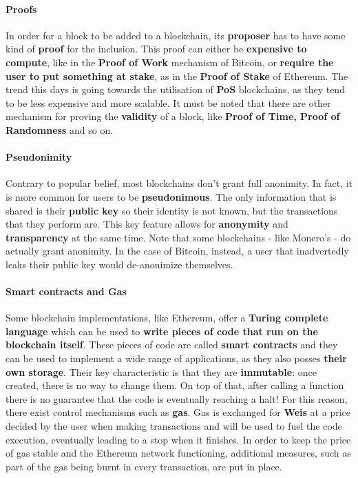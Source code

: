 \documentclass[12pt,a4paper,oneside]{article}
\theoremstyle{definition}
\begin{document}
\paragraph{Proofs} In order for a block to be added to a blockchain, its \textbf{proposer} has to have some kind of \textbf{proof} for the inclusion. This proof can either be \textbf{expensive to compute}, like in the \textbf{Proof of Work} mechanism of Bitcoin, or \textbf{require the user to put something at stake}, as in the \textbf{Proof of Stake} of Ethereum. The trend this days is going towards the utilisation of \textbf{PoS} blockchains, as they tend to be less expensive and more scalable. It must be noted that there are other mechanism for proving the \textbf{validity} of a block, like \textbf{Proof of Time, Proof of Randomness} and so on.

\paragraph{Pseudonimity} Contrary to popular belief, most blockchains don't grant full anonimity. In fact, it is more common for users to be \textbf{pseudonimous}. The only information that is shared is their \textbf{public key} so their identity is not known, but the transactions that they perform are. This key feature allows for \textbf{anonymity} and \textbf{transparency} at the same time. Note that some blockchains - like Monero's - do actually grant anonimity. In the case of Bitcoin, instead, a user that inadvertedly leaks their public key would de-anonimize themselves.

\paragraph{Smart contracts and Gas} Some blockchain implementations, like Ethereum, offer a \textbf{Turing complete language} which can be used to \textbf{write pieces of code that run on the blockchain itself}. These pieces of code are called \textbf{smart contracts} and they can be used to implement a wide range of applications, as they also posses \textbf{their own storage}. Their key characteristic is that they are \textbf{immutable}: once created, there is no way to change them. On top of that, after calling a function there is no guarantee that the code is eventually reaching a halt! For this reason, there exist control mechanisms such as \textbf{gas}. Gas is exchanged for \textbf{Weis} at a price decided by the user when making  transactions and will be used to fuel the code execution, eventually leading to a stop when it finishes. In order to keep the price of gas stable and the Ethereum network functioning, additional measures, such as part of the gas being burnt in every transaction, are put in place.
\end{document}
